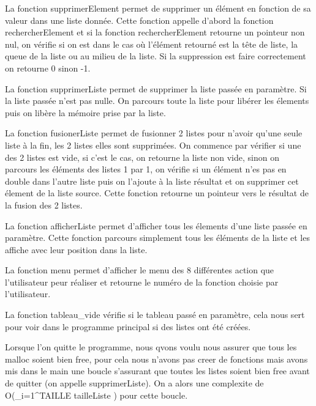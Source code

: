 \documentclass[11pt]{report}
\begin{document}
\medskip

La fonction supprimerElement permet de supprimer un élément en fonction de sa valeur dans une liste donnée. Cette fonction appelle d'abord la fonction rechercherElement et si la fonction rechercherElement retourne un pointeur non nul, on vérifie si on est dans le cas où l'élément retourné est la tête de liste, la queue de la liste ou au milieu de la liste. 
Si la suppression est faire correctement on retourne 0 sinon -1. 

\medskip

La fonction supprimerListe permet de supprimer la liste passée en paramètre. Si la liste passée n'est pas nulle. On parcours toute la liste pour libérer les élements puis on libère la mémoire prise par la liste. 

\medskip

La fonction fusionerListe permet de fusionner 2 listes pour n'avoir qu'une seule liste à la fin, les 2 listes elles sont supprimées. On commence par vérifier si une des 2 listes est vide, si c'est le cas, on retourne la liste non vide, sinon on parcours les éléments des listes 1 par 1, on vérifie si un élément n'es pas en double dans l'autre liste puis on l'ajoute à la liste résultat et on supprimer cet élement de la liste source. Cette fonction retourne un pointeur vers le résultat de la fusion des 2 listes. 

\medskip

La fonction afficherListe permet d'afficher tous les élements d'une liste passée en paramètre. Cette fonction parcours simplement tous les éléments de la liste et les affiche avec leur position dans la liste. 

\medskip

La fonction menu permet d'afficher le menu des 8 différentes action que l'utilisateur peur réaliser et retourne le numéro de la fonction choisie par l'utilisateur. 

\medskip

La fonction tableau\_vide vérifie si le tableau passé en paramètre, cela nous sert pour voir dans le programme principal si des listes ont été créées. 

\medskip

Lorsque l'on quitte le programme, nous qvons voulu nous assurer que tous les malloc soient bien free, pour cela nous n'avons pas creer de fonctions mais avons mis dans le main une boucle s'assurant que toutes les listes soient bien free avant de quitter (on appelle supprimerListe). On a alors une complexite de O(\sum\limits_{i=1}^TAILLE tailleListe ) pour cette boucle.
\end{document}
